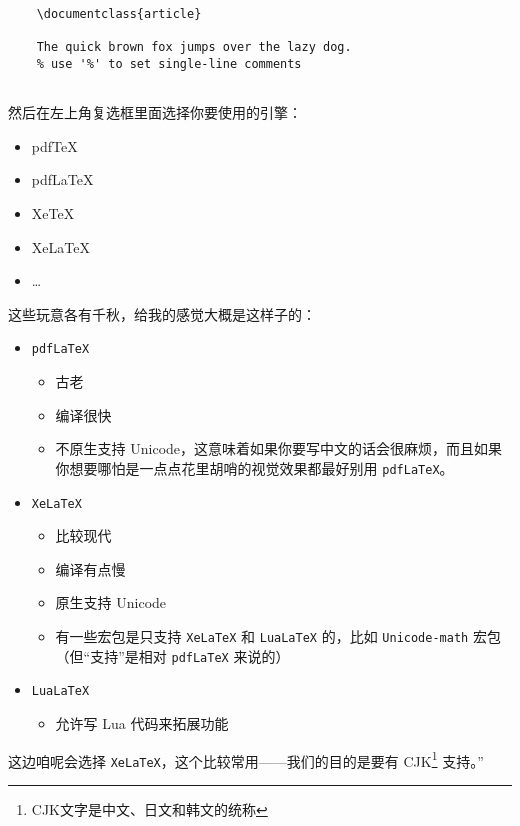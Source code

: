 \begin{lstlisting}
    \documentclass{article}
    
    The quick brown fox jumps over the lazy dog.
    % use '%' to set single-line comments
    
\end{lstlisting}

然后在左上角复选框里面选择你要使用的引擎：

\begin{itemize}\ttfamily
    \item pdfTeX
    \item pdfLaTeX
    \item XeTeX
    \item XeLaTeX
    \item \dots
\end{itemize}

这些玩意各有千秋，给我的感觉大概是这样子的：

\begin{itemize}
    \item \verb"pdfLaTeX"
          \begin{itemize}
              \item 古老
              \item 编译很快
              \item 不原生支持 Unicode，这意味着如果你要写中文的话会很麻烦，而且如果你想要哪怕是一点点花里胡哨的视觉效果都最好别用 \verb"pdfLaTeX"。
          \end{itemize}
    \item \verb"XeLaTeX"
          \begin{itemize}
              \item 比较现代
              \item 编译有点慢
              \item 原生支持 Unicode
              \item 有一些宏包是只支持 \verb"XeLaTeX" 和 \verb"LuaLaTeX" 的，比如 \verb"Unicode-math" 宏包（但“支持”是相对 \verb"pdfLaTeX" 来说的）
          \end{itemize}
    \item \verb"LuaLaTeX"
          \begin{itemize}
              \item 允许写 Lua 代码来拓展功能
          \end{itemize}
\end{itemize}

这边咱呢会选择 \verb`XeLaTeX`，这个比较常用——我们的目的是要有 CJK\footnote{CJK文字是中文、日文和韩文的统称} 支持。”


